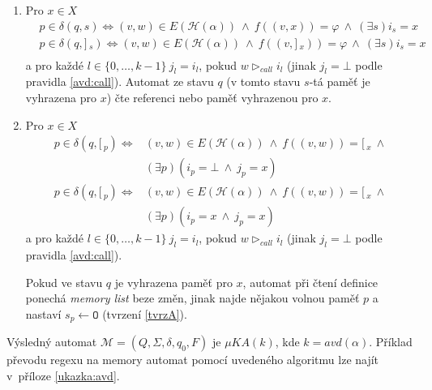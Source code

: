 \documentclass[thesis=B,czech]{FITthesis}[2019/12/23]
\theoremstyle{definition}
\begin{document}
\begin{enumerate}
{	S $x$-přechodem ze stavu $q$ lze zacházet jako s~$\varepsilon$-přechodem, pokud v~$q$ není vyhrazena žádná paměť pro $x$.}
	\item{Pro $x \in X$
	 \begin{equation}\begin{split}&p \in \delta(q, s) \iff (v, w) \in E(\mathcal{H}(\alpha)) \ \wedge \ f((v, x))=\varphi \ \wedge \  (\exists s) i_s = x \\
						   &p \in \delta(q, ]\,_s) \iff (v, w) \in E(\mathcal{H}(\alpha)) \ \wedge \ f((v, ]\,_x))=\varphi \ \wedge \  (\exists s) i_s = x \\
	\end{split}\end{equation}  a 
			pro každé $l \in \{0, \dots, k-1\} \  j_l = i_l$, pokud $w \triangleright_{call} i_l$ (jinak $j_l = \bot$ podle pravidla \ref{avd:call}).
Automat ze stavu $q$ (v tomto stavu $s$-tá paměť je vyhrazena pro $x$) čte referenci nebo  paměť vyhrazenou pro $x$. }
	\item\label{rule7}{Pro $x \in X$
		\begin{equation}\label{tvrzA}\begin{split} p \in \delta(q, [\,_p) \iff &(v, w) \in E(\mathcal{H}(\alpha)) \ \wedge \ f((v, w))= [\,_x \ \wedge \\  &(\exists p) (i_p = \bot \ \wedge \ j_p=x)\end{split}\end{equation}
		\begin{equation}\begin{split}
		 p \in \delta(q, [\,_p) \iff &(v, w) \in E(\mathcal{H}(\alpha)) \ \wedge \ f((v, w))= [\,_x \ \wedge \\ &(\exists p) (i_p = x \ \wedge \ j_p=x) 
		\end{split}\end{equation} a 
			pro každé $l \in \{0, \dots, k-1\} \  j_l = i_l$, pokud $w \triangleright_{call} i_l$ (jinak $j_l = \bot$ podle pravidla \ref{avd:call}).

		Pokud ve stavu $q$ je vyhrazena paměť pro $x$, automat při čtení definice ponechá \emph{memory list} beze změn, jinak najde nějakou volnou paměť $p$ a nastaví $s_p \gets \texttt{O}$ (tvrzení \ref{tvrzA}).
	
	}
	\end{enumerate}
	Výsledný automat $\mathcal{M} = (Q, \Sigma, \delta, q_0, F)$ je $\mu KA(k)$, kde $k = avd(\alpha)$.
	Příklad převodu regexu na memory automat pomocí uvedeného algoritmu lze najít v~příloze \ref{ukazka:avd}.
\end{document}
